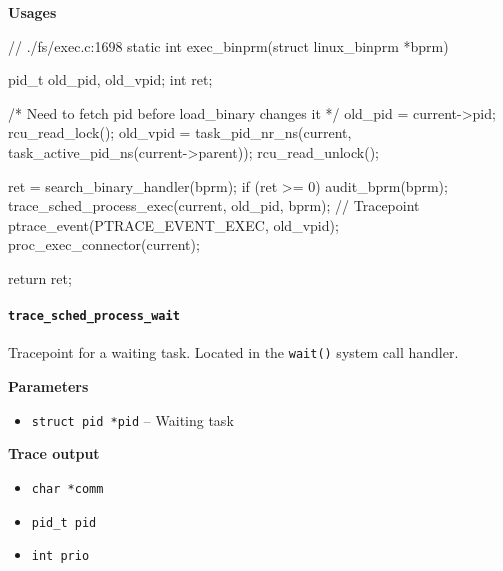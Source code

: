 \textbf{Usages}
\begin{code}
// ./fs/exec.c:1698
static int exec_binprm(struct linux_binprm *bprm){
	pid_t old_pid, old_vpid;
	int ret;

	/* Need to fetch pid before load_binary changes it */
	old_pid = current->pid;
	rcu_read_lock();
	old_vpid = task_pid_nr_ns(current, task_active_pid_ns(current->parent));
	rcu_read_unlock();

	ret = search_binary_handler(bprm);
	if (ret >= 0) {
		audit_bprm(bprm);
		trace_sched_process_exec(current, old_pid, bprm); // Tracepoint
		ptrace_event(PTRACE_EVENT_EXEC, old_vpid);
		proc_exec_connector(current);
	}

	return ret;
}
\end{code}
  
\paragraph{\texttt{trace\_sched\_process\_wait}}
Tracepoint for a waiting task. Located in the \verb|wait()| system call handler.

\textbf{Parameters}
\begin{itemize}
    \item \verb|struct pid *pid| -- Waiting task
\end{itemize}

\textbf{Trace output}
\begin{itemize}
    \item \verb|char *comm|
    \item \verb|pid_t pid|
    \item \verb|int prio|
\end{itemize}

